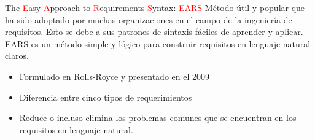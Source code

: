 \documentclass[
  24pt, %
  aspectratio=169, %
]{beamer}
\begin{document}
\begin{frame}{The \textcolor{red}{E}asy \textcolor{red}{A}pproach to \textcolor{red}{R}equirements \textcolor{red}{S}yntax: \textcolor{red}{EARS}}
  Método útil y popular que ha sido adoptado por muchas organizaciones en el campo de la ingeniería de requisitos. Esto se debe a sus patrones de sintaxis fáciles de aprender y aplicar. EARS es un método simple y lógico para construir requisitos en lenguaje natural claros.\\
  \bigskip %
  \begin{itemize}
  \item Formulado en Rolls-Royce y presentado en el 2009
  \item Diferencia entre cinco tipos de requerimientos
  \item Reduce o incluso elimina los problemas comunes que se encuentran en los requisitos en lenguaje natural.
  \end{itemize}
  
\end{frame}
\end{document}
